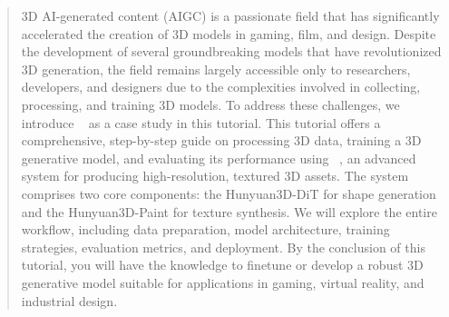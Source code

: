 \begin{abstract}
3D AI-generated content (AIGC) is a passionate field that has significantly accelerated the creation of 3D models in gaming, film, and design. Despite the development of several groundbreaking models that have revolutionized 3D generation, the field remains largely accessible only to researchers, developers, and designers due to the complexities involved in collecting, processing, and training 3D models. To address these challenges, we introduce ~\methodName{} as a case study in this tutorial. This tutorial offers a comprehensive, step-by-step guide on processing 3D data, training a 3D generative model, and evaluating its performance using ~\methodName{}, an advanced system for producing high-resolution, textured 3D assets. The system comprises two core components: the Hunyuan3D-DiT for shape generation and the Hunyuan3D-Paint for texture synthesis. We will explore the entire workflow, including data preparation, model architecture, training strategies, evaluation metrics, and deployment. By the conclusion of this tutorial, you will have the knowledge to finetune or develop a robust 3D generative model suitable for applications in gaming, virtual reality, and industrial design.
\end{abstract}


 
